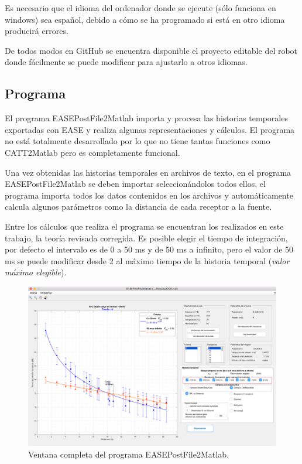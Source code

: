 Es necesario que el idioma del ordenador donde se ejecute (sólo funciona en windows) sea español, debido a cómo se ha programado si está en otro idioma producirá errores.

De todos modos en GitHub se encuentra disponible el proyecto editable del robot donde fácilmente se puede modificar para ajustarlo a otros idiomas.
\newpage
\subsection{Programa}

El programa EASEPostFile2Matlab importa y procesa las historias temporales exportadas con EASE y realiza algunas representaciones y cálculos. El programa no está totalmente desarrollado por lo que no tiene tantas funciones como CATT2Matlab pero es completamente funcional.

Una vez obtenidas las historias temporales en archivos de texto, en el programa EASEPostFile2Matlab se deben importar seleccionándolos todos ellos, el programa importa todos los datos contenidos en los archivos y automáticamente calcula algunos parámetros como la distancia de cada receptor a la fuente.

Entre los cálculos que realiza el programa se encuentran los realizados en este trabajo, la teoría revisada corregida. Es posible elegir el tiempo de integración, por defecto el intervalo es de 0 a 50 ms y de 50 ms a infinito, pero el valor de 50 ms se puede modificar desde 2 al máximo tiempo de la historia temporal (\textit{valor máximo elegible}).

\begin{figure}[ht]
    \centering
    \includegraphics[width=\textwidth]{archivos/capturas/EASEPostFile2Matlab1}
    \caption{Ventana completa del programa EASEPostFile2Matlab.}
\end{figure}
\FloatBarrier

